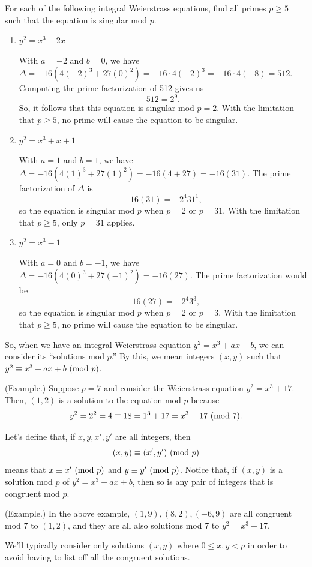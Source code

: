 \documentclass[letterpaper]{article}
\begin{document}
\begin{mdframed}
    For each of the following integral Weierstrass equations, find all primes $p \geq 5$ such that the equation is singular mod $p$. 
    \begin{enumerate}
        \item $y^2 = x^3 - 2x$    
        \begin{mdframed}
            With $a = -2$ and $b = 0$, we have $\Delta = -16(4(-2)^3 + 27(0)^2) = -16 \cdot 4(-2)^3 = -16 \cdot 4(-8) = 512$. Computing the prime factorization of 512 gives us 
            \[512 = 2^9.\]
            So, it follows that this equation is singular mod $p = 2$. With the limitation that $p \geq 5$, no prime will cause the equation to be singular. 
        \end{mdframed}
        \item $y^2 = x^3 + x + 1$
        \begin{mdframed}
            With $a = 1$ and $b = 1$, we have $\Delta = -16(4(1)^3 + 27(1)^2) = -16(4 + 27) = -16(31)$. The prime factorization of $\Delta$ is 
            \[-16(31) = -2^4 31^1,\]
            so the equation is singular mod $p$ when $p = 2$ or $p = 31$. With the limitation that $p \geq 5$, only $p = 31$ applies.
        \end{mdframed}
        \item $y^2 = x^3 - 1$
        \begin{mdframed}
            With $a = 0$ and $b = -1$, we have $\Delta = -16(4(0)^3 + 27(-1)^2) = -16(27).$ The prime factorization would be \[-16(27) = -2^4 3^3,\]
            so the equation is singular mod $p$ when $p = 2$ or $p = 3$. With the limitation that $p \geq 5$, no prime will cause the equation to be singular. 
        \end{mdframed}
    \end{enumerate}
\end{mdframed}
So, when we have an integral Weierstrass equation $y^2 = x^3 + ax + b$, we can consider its ``solutions mod $p$.'' By this, we mean integers $(x, y)$ such that $y^2 \equiv x^3 + ax + b \ (\mathrm{mod}\ p)$. 

\begin{mdframed}
    (Example.) Suppose $p = 7$ and consider the Weierstrass equation $y^2 = x^3 + 17$. Then, $(1, 2)$ is a solution to the equation mod $p$ because 
    \[y^2 = 2^2 = 4 \equiv 18 = 1^3 + 17 = x^3 + 17 \ (\mathrm{mod}\ 7).\]
\end{mdframed}
Let's define that, if $x, y, x', y'$ are all integers, then 
\[(x, y) \equiv (x', y') \ (\mathrm{mod}\ p)\]
means that $x \equiv x' \ (\mathrm{mod}\ p)$ and $y \equiv y' \ (\mathrm{mod}\ p)$. Notice that, if $(x, y)$ is a solution mod $p$ of $y^2 = x^3 + ax + b$, then so is any pair of integers that is congruent mod $p$. 
\begin{mdframed}
    (Example.) In the above example, $(1, 9), (8, 2), (-6, 9)$ are all congruent mod 7 to $(1, 2)$, and they are all also solutions mod 7 to $y^2 = x^3 + 17$. 
\end{mdframed}    
We'll typically consider only solutions $(x, y)$ where $0 \leq x, y < p$ in order to avoid having to list off all the congruent solutions.
\end{document}
